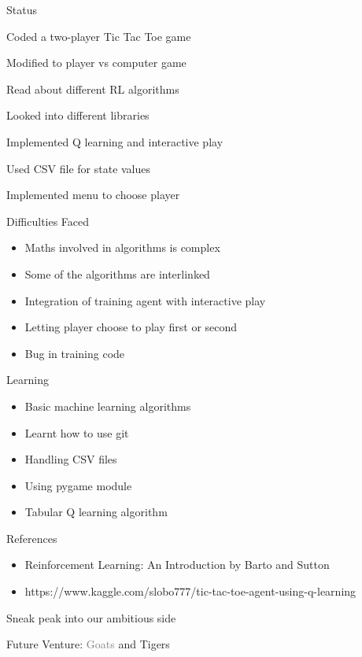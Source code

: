 \documentclass[14pt]{beamer}
\begin{document}
\begin{frame}{Status}
    \begin{description}[STATUS]
        \item[\color{myPink}{24 Jun 2020}] Coded a two-player Tic Tac Toe game
        \item[\color{myPink}{27 Jun 2020}] Modified to player vs computer game
        \item[\color{myPink}{29 Jun 2020}] Read about different RL algorithms
        \item[\color{myPink}{04 Jul 2020}] Looked into different libraries
        \item[\color{myPink}{11 Jul 2020}] Implemented Q learning and interactive play
        \item[\color{myPink}{12 Jul 2020}] Used CSV file for state values
        \item[\color{myPink}{10 Aug 2020}] Implemented menu to choose player
    \end{description}
\end{frame}

\begin{frame}{Difficulties Faced}
    \begin{itemize}
        \item Maths involved in algorithms is complex
        \item Some of the algorithms are interlinked
        \item Integration of training agent with interactive play
        \item Letting player choose to play first or second
        \item Bug in training code
    \end{itemize}
\end{frame}

\begin{frame}{Learning}
    \begin{itemize}
        \item Basic machine learning algorithms
        \item Learnt how to use git
        \item Handling CSV files
        \item Using pygame module
        \item Tabular Q learning algorithm
    \end{itemize}
\end{frame}

\begin{frame}{References}
    \begin{itemize}
        \item Reinforcement Learning: An Introduction by Barto and Sutton
        \item https://www.kaggle.com/slobo777/tic-tac-toe-agent-using-q-learning
    \end{itemize}
\end{frame}

\begin{frame}{Sneak peak into our ambitious side}
    \begin{center}
        Future Venture: \textcolor{gray}{Goats} and \textcolor{myAmber}{Tigers}
    \end{center}
\end{frame}
\end{document}

